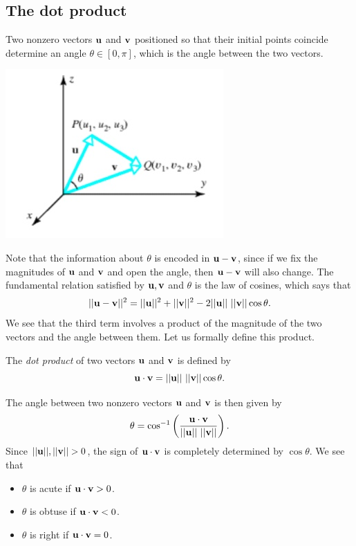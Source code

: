 \documentclass[12pt,letterpaper,reqno]{article}
\numberwithin{equation}{section}
\newcommand{\ti}[1]{\textit{#1}}
\begin{document}
\subsection{The dot product}
Two nonzero vectors ${\bf u}$ and ${\bf v}$ positioned so that their initial points coincide determine an angle $\theta \in [0,\pi]$, which is the angle between the two vectors.
\begin{center}
	\includegraphics[scale=0.5]{figures_mvc/angle_uv}
\end{center}
Note that the information about $\theta$ is encoded in ${\bf u}-{\bf v}$, since if we fix the magnitudes of ${\bf u}$ and ${\bf v}$ and open the angle, then ${\bf u}-{\bf v}$ will also change. The fundamental relation satisfied by ${\bf u}, {\bf v}$ and $\theta$ is the law of cosines, which says that 
\begin{equation}\label{eq:law_of_cosines}
	||{\bf u}-{\bf v}||^2=||{\bf u}||^2+||{\bf v}||^2-2||{\bf u}|| \ ||{\bf v}||\cos \theta. 
\end{equation}
We see that the third term involves a product of the magnitude of the two vectors and the angle between them. Let us formally define this product. 
\begin{defn}
	The \ti{dot product} of two vectors ${\bf u}$ and ${\bf v}$ is defined by
	\begin{equation}\label{eq:dot_product_def}
		{\bf u}\cdot {\bf v}=||{\bf u}|| \ ||{\bf v}||\cos\theta.
	\end{equation} 
\end{defn}
The angle between two nonzero vectors ${\bf u}$ and ${\bf v}$ is then given by
\begin{equation}\label{eq:angle_uv}
	\theta=\cos^{-1}\left(\frac{{\bf u}\cdot {\bf v}}{||{\bf u}|| \ ||{\bf v}||}\right).
\end{equation}	
Since $||{\bf u}||, ||{\bf v}||>0$, the sign of ${\bf u} \cdot {\bf v}$ is completely determined by $\cos \theta$. We see that 
\begin{itemize}
	\item $\theta$ is acute if ${\bf u} \cdot {\bf v} > 0$.
	\item $\theta$ is obtuse if ${\bf u} \cdot {\bf v} < 0$.
	\item $\theta$ is right if ${\bf u} \cdot {\bf v} = 0$.
\end{itemize}
\end{document}
